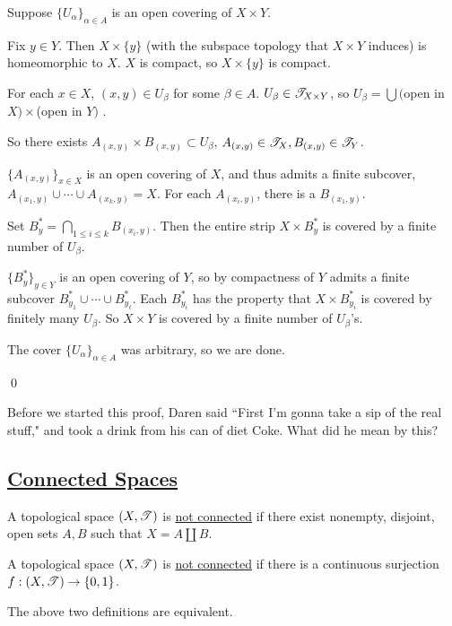 \documentclass[x11names,reqno,14pt]{extarticle}
\begin{document}
\proof

Suppose $\{U_\alpha\}_{\alpha \in A}$ is an open covering of $X\times Y$.

Fix $y \in Y$. Then $X\times\{y\}$ (with the subspace topology that $X\times Y$ induces) is homeomorphic to $X$. $X$ is compact, so $X\times\{y\}$ is compact. 

For each $x \in X$, $(x, y) \in U_\beta$ for some $\beta \in A$. $U_\beta\in\mathscr{T}_{X\times Y}$, so $U_\beta = \bigcup($open in $X) \times$(open in $Y)$ . 

So there exists $A_{(x, y)}\times B_{(x, y)} \subset U_\beta$, $A_{(x, y)} \in \mathscr{T}_X, B_{(x, y)}\in\mathscr{T}_Y$. 

$\{A_{(x, y)}\}_{x\in X}$ is an open covering of $X$, and thus admits a finite subcover, $A_{(x_1, y)}\cup\cdots\cup A_{(x_k, y)} = X$. For each $A_{(x_i, y)}$, there is a $B_{(x_1, y)}$. 

Set $B_y^* = \bigcap_{1\leq i \leq k}B_{(x_i, y)}$. Then the entire strip $X\times B_y^*$ is covered by a finite number of $U_\beta$.

$\{B_y^*\}_{y\in Y}$ is an open covering of $Y$, so by compactness of $Y$ admits a finite subcover $B_{y_1}^*\cup\cdots\cup B_{y_\ell}^*$. Each $B_{y_i}^*$ has the property that $X\times B_{y_i}^*$ is covered by finitely many $U_\beta$. So $X \times Y$ is covered by a finite number of $U_{\beta}$'s. 

The cover $\{U_\alpha\}_{\alpha \in A}$ was arbitrary, so we are done. 

\qed

Before we started this proof, Daren said ``First I'm gonna take a sip of the real stuff," and took a drink from his can of diet Coke. What did he mean by this? 

\subsection*{\underline{Connected Spaces}}


A topological space $(X, \mathscr{T})$ is \underline{not connected} if there exist nonempty, disjoint, open sets $A, B$ such that $X = A\coprod B$. 


A topological space $(X, \mathscr{T})$ is \underline{not connected} if there is a continuous surjection $f:(X,\mathscr{T})\to\{0,1\}$.

\prop

The above two definitions are equivalent. 
\end{document}

